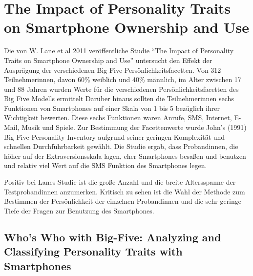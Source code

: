 \section*{The Impact of Personality Traits on Smartphone Ownership and Use}

Die von W. Lane et al 2011 veröffentliche Studie "`The Impact of Personality Traits on Smartphone Ownership and Use"' untersucht den Effekt der Ausprägung der verschiedenen Big Five Persönlichkeitsfacetten.
Von 312 Teilnehmerinnen, davon 60\% weiblich und 40\% männlich, im Alter zwischen 17 und 88 Jahren wurden Werte für die verschiedenen Persönlichkeitsfacetten des Big Five Modells ermittelt
Darüber hinaus sollten die Teilnehmerinnen sechs Funktionen von Smartphones auf einer Skala von 1 bis 5 bezüglich ihrer Wichtigkeit bewerten.
Diese sechs Funktionen waren Anrufe, SMS, Internet, E-Mail, Musik und Spiele.
Zur Bestimmung der Facettenwerte wurde John's (1991) Big Five Personality Inventory aufgrund seiner geringen Komplexität und schnellen Durchführbarkeit gewählt.
Die Studie ergab, dass Probandinnen, die höher auf der Extraversionsskala lagen, eher Smartphones besaßen und benutzen und relativ viel Wert auf die SMS Funktion des Smartphones legen. 
\par
Positiv bei Lanes Studie ist die große Anzahl und die breite Altersspanne der Testprobandinnen anzumerken.
Kritisch zu sehen ist die Wahl der Methode zum Bestimmen der Persönlichkeit der einzelnen Probandinnen und die sehr geringe Tiefe der Fragen zur Benutzung des Smartphones.


\subsection*{Who’s Who with Big-Five: Analyzing and Classifying Personality Traits with Smartphones}

